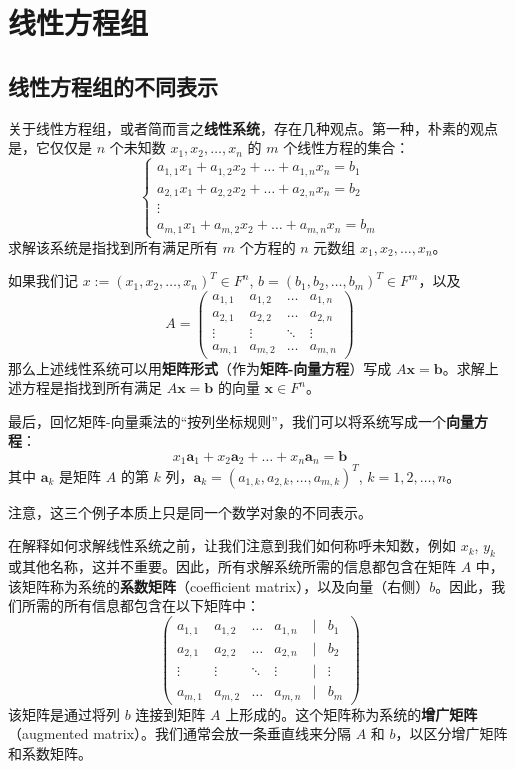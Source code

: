 \chapter{线性方程组}

\section{线性方程组的不同表示}

关于线性方程组，或者简而言之\textbf{线性系统}，存在几种观点。第一种，朴素的观点是，它仅仅是 $n$ 个未知数 $x_1, x_2, \dots, x_n$ 的 $m$ 个线性方程的集合：
$$
\begin{cases}
a_{1,1} x_1 + a_{1,2} x_2 + \dots + a_{1,n} x_n = b_1 \\
a_{2,1} x_1 + a_{2,2} x_2 + \dots + a_{2,n} x_n = b_2 \\
\vdots \\
a_{m,1} x_1 + a_{m,2} x_2 + \dots + a_{m,n} x_n = b_m
\end{cases}
$$
求解该系统是指找到所有满足所有 $m$ 个方程的 $n$ 元数组 $x_1, x_2, \dots, x_n$。

如果我们记 $x := (x_1, x_2, \dots, x_n)^T \in F^n$, $b = (b_1, b_2, \dots, b_m)^T \in F^m$，以及
$$
A = \begin{pmatrix}
a_{1,1} & a_{1,2} & \dots & a_{1,n} \\
a_{2,1} & a_{2,2} & \dots & a_{2,n} \\
\vdots & \vdots & \ddots & \vdots \\
a_{m,1} & a_{m,2} & \dots & a_{m,n}
\end{pmatrix}
$$
那么上述线性系统可以用\textbf{矩阵形式}（作为\textbf{矩阵-向量方程}）写成 $A \mathbf{x} = \mathbf{b}$。求解上述方程是指找到所有满足 $A \mathbf{x} = \mathbf{b}$ 的向量 $\mathbf{x} \in F^n$。

最后，回忆矩阵-向量乘法的“按列坐标规则”，我们可以将系统写成一个\textbf{向量方程}：
$$
x_1 \mathbf{a}_1 + x_2 \mathbf{a}_2 + \dots + x_n \mathbf{a}_n = \mathbf{b}
$$
其中 $\mathbf{a}_k$ 是矩阵 $A$ 的第 $k$ 列，$\mathbf{a}_k = (a_{1,k}, a_{2,k}, \dots, a_{m,k})^T$, $k = 1, 2, \dots, n$。

注意，这三个例子本质上只是同一个数学对象的不同表示。

在解释如何求解线性系统之前，让我们注意到我们如何称呼未知数，例如 $x_k$, $y_k$ 或其他名称，这并不重要。因此，所有求解系统所需的信息都包含在矩阵 $A$ 中，该矩阵称为系统的\textbf{系数矩阵}（coefficient matrix），以及向量（右侧）$b$。因此，我们所需的所有信息都包含在以下矩阵中：
$$
\begin{pmatrix}
a_{1,1} & a_{1,2} & \dots & a_{1,n} & | & b_1 \\
a_{2,1} & a_{2,2} & \dots & a_{2,n} & | & b_2 \\
\vdots & \vdots & \ddots & \vdots & | & \vdots \\
a_{m,1} & a_{m,2} & \dots & a_{m,n} & | & b_m
\end{pmatrix}
$$
该矩阵是通过将列 $b$ 连接到矩阵 $A$ 上形成的。这个矩阵称为系统的\textbf{增广矩阵}（augmented matrix）。我们通常会放一条垂直线来分隔 $A$ 和 $b$，以区分增广矩阵和系数矩阵。


